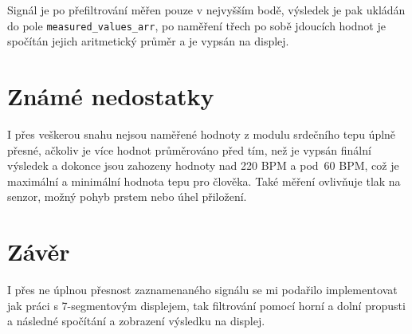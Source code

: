 \documentclass[a4paper, 11pt]{article}
\begin{document}
Signál je po přefiltrování měřen pouze v nejvyšším bodě, výsledek je pak ukládán do pole \verb|measured_values_arr|, po naměření třech po sobě jdoucích hodnot je spočítán jejich aritmetický průměr a je vypsán na displej. 
\section{Známé nedostatky}
I přes veškerou snahu nejsou naměřené hodnoty z modulu srdečního tepu úplně přesné, ačkoliv je více hodnot průměrováno před tím, než je vypsán finální výsledek a dokonce jsou zahozeny hodnoty nad 220 BPM a pod~60 BPM, což je maximální a minimální hodnota tepu pro člověka. Také měření ovlivňuje tlak na senzor, možný pohyb prstem nebo úhel přiložení.
\section{Závěr}
I přes ne úplnou přesnost zaznamenaného signálu se mi podařilo implementovat jak práci s 7-segmentovým displejem, tak filtrování pomocí horní a dolní propusti a následné spočítání a zobrazení výsledku na displej. 
\newpage

\end{document}
